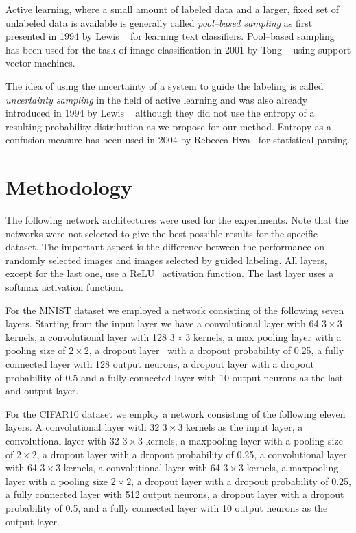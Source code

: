 \documentclass[10pt,twocolumn,letterpaper]{article}
\begin{document}
Active learning, where a small amount of labeled data and a larger,
fixed set of unlabeled data is available is generally called
\textit{pool--based sampling} as first presented in 1994 by Lewis
\etal~\cite{lewis1994sequential} for learning text classifiers.
Pool--based sampling has been used for the task of image classification
in 2001 by Tong \etal~\cite{tong2001support} using support vector
machines.

The idea of using the uncertainty of a system to guide the labeling is
called \textit{uncertainty sampling} in the field of active learning
and was also already introduced in 1994 by Lewis
\etal~\cite{lewis1994sequential} although they did not use the entropy
of a resulting probability distribution as we propose for our method.
Entropy as a confusion measure has been used in 2004 by Rebecca
Hwa~\cite{hwa2004sample} for statistical parsing.

\section{Methodology}
\label{sec:empl-arch}
The following network architectures were used for the experiments.
Note that the networks were not selected to give the best possible
results for the specific dataset. The important aspect is the
difference between the performance on randomly selected images and
images selected by guided labeling. All layers, except for the last
one, use a ReLU~\cite{nair2010rectified} activation function. The last
layer uses a softmax activation function.

For the MNIST dataset we employed a network consisting of the
following seven layers. Starting from the input layer we have a
convolutional layer with 64 $3 \times 3$ kernels, a convolutional layer
with 128 $3 \times 3$ kernels, a max pooling layer with a pooling size of
$2 \times 2$, a dropout layer~\cite{srivastava2014dropout} with a dropout
probability of 0.25, a fully connected layer with 128 output neurons,
a dropout layer with a dropout probability of 0.5 and a fully
connected layer with 10 output neurons as the last and output layer.

For the CIFAR10 dataset we employ a network consisting of the
following eleven layers. A convolutional layer with 32 $3 \times 3$ kernels
as the input layer, a convolutional layer with 32 $3 \times 3$ kernels, a
maxpooling layer with a pooling size of $2 \times 2$, a dropout layer with
a dropout probability of 0.25, a convolutional layer with 64
$3 \times 3$ kernels, a convolutional layer with 64 $3 \times 3$ kernels, a
maxpooling layer with a pooling size $2 \times 2$, a dropout layer with a
dropout probability of 0.25, a fully connected layer with 512 output
neurons, a dropout layer with a dropout probability of 0.5, and a
fully connected layer with 10 output neurons as the output layer.
\end{document}
